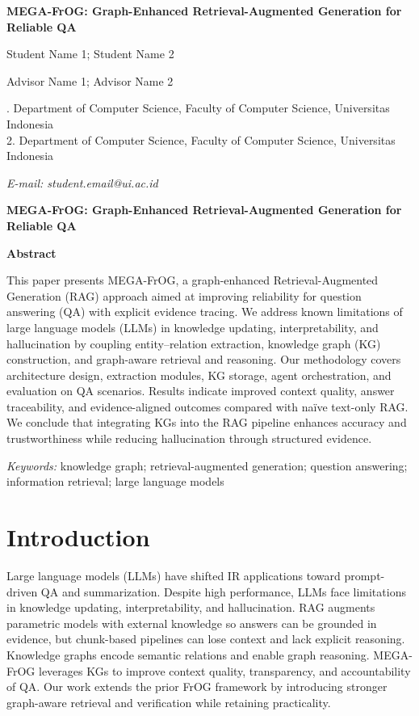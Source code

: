 \documentclass[12pt,a4paper,onecolumn]{article}
\makeatletter
\def\judul{MEGA-FrOG: Graph-Enhanced Retrieval-Augmented Generation for Reliable QA}
\def\judulInggris{MEGA-FrOG: Graph-Enhanced Retrieval-Augmented Generation for Reliable QA}
\def\penulisMahasiswa{Student Name 1; Student Name 2}
\def\penulisPembimbing{Advisor Name 1; Advisor Name 2}
\def\afiliasiSatu{Department of Computer Science, Faculty of Computer Science, Universitas Indonesia}
\def\afiliasiDua{Department of Computer Science, Faculty of Computer Science, Universitas Indonesia}
\def\emailSatu{student.email@ui.ac.id}
\renewcommand\maketitle{%
  \begin{center}
    {\fontsize{14}{17}\selectfont\bfseries \judul\par\vspace{12pt}}
    {\normalsize \penulisMahasiswa\par}
    {\normalsize \penulisPembimbing\par\vspace{12pt}}
    {\fontsize{10}{12}\selectfont
      1. \afiliasiSatu\\
      2. \afiliasiDua\par}
    \vspace{12pt}
    {\fontsize{10}{12}\selectfont\itshape E-mail: \emailSatu\par}
  \end{center}
}
\makeatother
\begin{document}
\maketitle

\vspace*{2\baselineskip}
{\begin{center}\textbf{\fontsize{12}{14}\selectfont \judulInggris}\end{center}}
\vspace{12pt}
{\begin{center}\textbf{\fontsize{12}{14}\selectfont Abstract}\end{center}}
\vspace{12pt}
{\fontsize{10}{12}\selectfont\singlespacing
This paper presents MEGA-FrOG, a graph-enhanced Retrieval-Augmented Generation (RAG) approach aimed at improving reliability for question answering (QA) with explicit evidence tracing. We address known limitations of large language models (LLMs) in knowledge updating, interpretability, and hallucination by coupling entity--relation extraction, knowledge graph (KG) construction, and graph-aware retrieval and reasoning. Our methodology covers architecture design, extraction modules, KG storage, agent orchestration, and evaluation on QA scenarios. Results indicate improved context quality, answer traceability, and evidence-aligned outcomes compared with naïve text-only RAG. We conclude that integrating KGs into the RAG pipeline enhances accuracy and trustworthiness while reducing hallucination through structured evidence.\par}

{\fontsize{10}{12}\selectfont\singlespacing\textit{Keywords:} knowledge graph; retrieval-augmented generation; question answering; information retrieval; large language models\par}

\section*{Introduction}
Large language models (LLMs) have shifted IR applications toward prompt-driven QA and summarization. Despite high performance, LLMs face limitations in knowledge updating, interpretability, and hallucination. RAG augments parametric models with external knowledge so answers can be grounded in evidence, but chunk-based pipelines can lose context and lack explicit reasoning. Knowledge graphs encode semantic relations and enable graph reasoning. MEGA-FrOG leverages KGs to improve context quality, transparency, and accountability of QA. Our work extends the prior FrOG framework by introducing stronger graph-aware retrieval and verification while retaining practicality.
\end{document}

